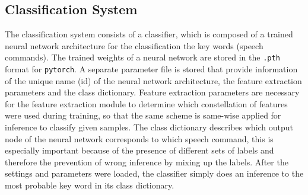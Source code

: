 


\subsection{Classification System}
The classification system consists of a classifier, which is composed of a trained neural network architecture for the classification the key words (speech commands).
The trained weights of a neural network are stored in the \texttt{.pth} format for \texttt{pytorch}.
A separate parameter file is stored that provide information of the unique name (id) of the neural network architecture, the feature extraction parameters and the class dictionary.
Feature extraction parameters are necessary for the feature extraction module to determine which constellation of features were used during training, so that the same scheme is same-wise applied for inference to classify given samples.
The class dictionary describes which output node of the neural network corresponds to which speech command, this is especially important because of the presence of different sets of labels and therefore the prevention of wrong inference by mixing up the labels.
After the settings and parameters were loaded, the classifier simply does an inference to the most probable key word in its class dictionary.

